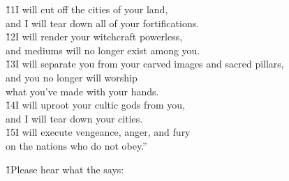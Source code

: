 \begin{poetry}
\poeml \v{11}I will cut off the cities of your land, \\
\poemll    and I will tear down all of your fortifications. \\
\poeml \v{12}I will render your witchcraft powerless, \\
\poemll    and mediums will no longer exist among you. \\
\poeml \v{13}I will separate you from your carved images and sacred pillars, \\
\poemll    and you no longer will worship \\
\poemlll       what you've made with your hands. \\
\poeml \v{14}I will uproot your cultic gods from you, \\
\poemll    and I will tear down your cities. \\
\poeml \v{15}I will execute vengeance, anger, and fury \\
\poemll    on the nations who do not obey.''
\end{poetry}

\v{1}Please hear what the  says:

